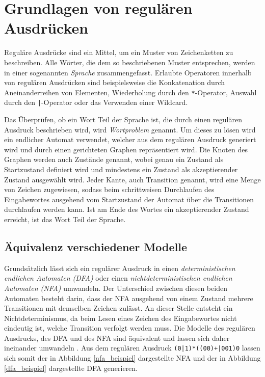 \chapter{Grundlagen von regulären Ausdrücken}

Reguläre Ausdrücke sind ein Mittel, um ein Muster von Zeichenketten zu beschreiben.
Alle Wörter, die dem so beschriebenen Muster entsprechen, werden in einer sogenannten \emph{Sprache} zusammengefasst.
Erlaubte Operatoren innerhalb von regulären Ausdrücken sind beispielsweise die Konkatenation durch Aneinanderreihen von Elementen, Wiederholung durch den \texttt{*}-Operator, Auswahl durch den \texttt{|}-Operator oder das Verwenden einer Wildcard.

Das Überprüfen, ob ein Wort Teil der Sprache ist, die durch einen regulären Ausdruck beschrieben wird, wird \emph{Wortproblem} genannt.
Um dieses zu lösen wird ein endlicher Automat verwendet, welcher aus dem regulären Ausdruck generiert wird und durch einen gerichteten Graphen repräsentiert wird.
Die Knoten des Graphen werden auch Zustände genannt, wobei genau ein Zustand als Startzustand definiert wird und mindestens ein Zustand als akzeptierender Zustand ausgewählt wird.
Jeder Kante, auch Transition genannt, wird eine Menge von Zeichen zugewiesen, sodass beim schrittweisen Durchlaufen des Eingabewortes ausgehend vom Startzustand der Automat über die Transitionen durchlaufen werden kann.
Ist am Ende des Wortes ein akzeptierender Zustand erreicht, ist das Wort Teil der Sprache.

\section{Äquivalenz verschiedener Modelle}

Grundsätzlich lässt sich ein regulärer Ausdruck in einen \emph{deterministischen endlichen Automaten (DFA)} oder einen \emph{nichtdeterministischen endlichen Automaten (NFA)} umwandeln.
Der Unterschied zwischen diesen beiden Automaten besteht darin, dass der NFA ausgehend von einem Zustand mehrere Transitionen mit demselben Zeichen zulässt.
An dieser Stelle entsteht ein Nichtdeterminismus, da beim Lesen eines Zeichen des Eingabewortes nicht eindeutig ist, welche Transition verfolgt werden muss.
Die Modelle des regulären Ausdrucks, des DFA und des NFA sind äquivalent und lassen sich daher ineinander umwandeln \cite{Hopcroft2002}.
Aus dem regulären Ausdruck \texttt{(0|1)*((00)+|001)0} lassen sich somit der in Abbildung \ref{nfa_beispiel} dargestellte NFA und der in Abbildung \ref{dfa_beispiel} dargestellte DFA generieren.

